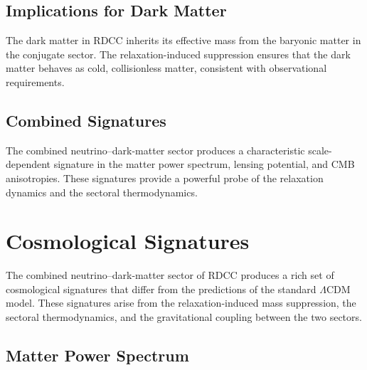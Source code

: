 \documentclass[11pt,a4paper]{article}
\begin{document}

\subsection{Implications for Dark Matter}

The dark matter in RDCC inherits its effective mass from the baryonic matter in
the conjugate sector. The relaxation-induced suppression ensures that the dark
matter behaves as cold, collisionless matter, consistent with observational
requirements.




\subsection{Combined Signatures}

The combined neutrino–dark-matter sector produces a characteristic
scale-dependent signature in the matter power spectrum, lensing potential, and
CMB anisotropies. These signatures provide a powerful probe of the relaxation
dynamics and the sectoral thermodynamics.


\section{Cosmological Signatures}

The combined neutrino–dark-matter sector of RDCC produces a rich set of
cosmological signatures that differ from the predictions of the standard
$\Lambda$CDM model. These signatures arise from the relaxation-induced mass
suppression, the sectoral thermodynamics, and the gravitational coupling
between the two sectors.




\subsection{Matter Power Spectrum}
\end{document}
